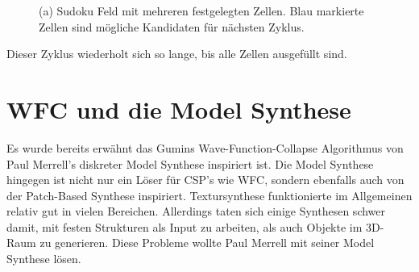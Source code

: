 \documentclass[12pt, a4paper,twoside,openright]{report} %
\begin{document}
\begin{figure}[H]
    \centering
    \caption{(a) Sudoku Feld mit mehreren festgelegten Zellen. Blau markierte Zellen sind mögliche Kandidaten für nächsten Zyklus.}%
\end{figure}

Dieser Zyklus wiederholt sich so lange, bis alle Zellen ausgefüllt sind.

\section{WFC und die Model Synthese}

Es wurde bereits erwähnt das Gumins Wave-Function-Collapse Algorithmus von Paul Merrell's diskreter Model Synthese inspiriert ist.
Die Model Synthese hingegen ist nicht nur ein Löser für CSP's wie WFC, sondern ebenfalls auch von der Patch-Based Synthese inspiriert.
Textursynthese funktionierte im Allgemeinen relativ gut in vielen Bereichen.
Allerdings taten sich einige Synthesen schwer damit, mit festen Strukturen als Input zu arbeiten, als auch Objekte im 3D-Raum zu generieren.
Diese Probleme wollte Paul Merrell mit seiner Model Synthese lösen.
\end{document}
